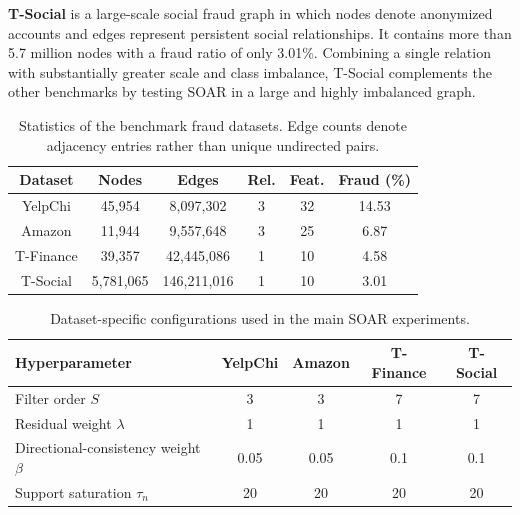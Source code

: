\documentclass[10pt,journal]{IEEEtran}
\begin{document}
\textbf{T-Social} \cite{tang2022bwgnn} is a large-scale social fraud graph in which nodes denote
anonymized accounts and edges represent persistent social relationships.
It contains more than 5.7 million nodes with a fraud ratio of only 3.01\%.
Combining a single relation with substantially greater scale and class
imbalance, T-Social complements the other benchmarks by testing SOAR in a
large and highly imbalanced graph.

\begin{table}[!t]
\caption{Statistics of the benchmark fraud datasets. Edge counts denote
adjacency entries rather than unique undirected pairs.}
\label{tab:data}
\centering
\footnotesize
\setlength{\tabcolsep}{5pt}
\renewcommand{\arraystretch}{1.15}
\begin{tabular}{cccccc}
\toprule
Dataset & Nodes & Edges & Rel. & Feat. & Fraud (\%) \\
\midrule
YelpChi   & 45,954    & 8,097,302   & 3 & 32 & 14.53 \\
Amazon    & 11,944    & 9,557,648   & 3 & 25 &  6.87 \\
T-Finance & 39,357    & 42,445,086  & 1 & 10 &  4.58 \\
T-Social  & 5,781,065 & 146,211,016 & 1 & 10 &  3.01 \\
\bottomrule
\end{tabular}
\end{table}

\begin{table}[!h]
\centering
\caption{Dataset-specific configurations used in the main SOAR experiments.}
\label{tab:config}
\footnotesize
\setlength{\tabcolsep}{3.8pt}
\renewcommand{\arraystretch}{1.18}
\begin{tabular}{@{}lcccc@{}}
\toprule
Hyperparameter & YelpChi & Amazon & T-Finance & T-Social \\
\midrule
Filter order $S$ & 3 & 3 & 7 & 7 \\
Residual weight $\lambda$ & 1 & 1 & 1 & 1 \\
Directional-consistency weight $\beta$ & 0.05 & 0.05 & 0.1 & 0.1 \\
Support saturation $\tau_n$ & 20 & 20 & 20 & 20 \\
\bottomrule
\end{tabular}
\end{table}
\end{document}
